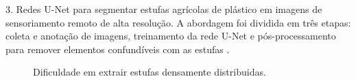 \documentclass[%
  10pt,%
  aspectratio = 169,%
  compress,%
  t,%
  english,%
  brazilian,%
  tikz,
]{beamer}
\begin{document}
\begin{frame}
    3. Redes U-Net para segmentar estufas agrícolas de plástico em imagens de sensoriamento remoto de alta resolução. A abordagem foi dividida em três etapas: coleta e anotação de imagens, treinamento da rede U-Net e pós-processamento para remover elementos confundíveis com as estufas \textbf{\cite{Chen2021}}.
    \begin{figure}[!htb]
        \centering%
        \caption{Dificuldade em extrair estufas densamente distribuidas.}%
        \label{fig:alam2021}
    \end{figure}
    
\end{frame}



\end{document}
